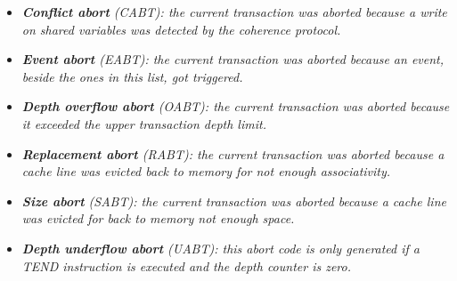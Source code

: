 \documentclass{article}
\begin{document}
            \begin{itemize}

                \item \textit{\textbf{Conflict abort} (CABT): the current transaction was aborted because a write on shared variables was detected by the coherence protocol.}

                \item \textit{\textbf{Event abort} (EABT): the current transaction was aborted because an event, beside the ones in this list, got triggered.}

                \item \textit{\textbf{Depth overflow abort} (OABT): the current transaction was aborted because it exceeded the upper transaction depth limit.}

                \item \textit{\textbf{Replacement abort} (RABT): the current transaction was aborted because a cache line was evicted back to memory for not enough associativity.}

                \item \textit{\textbf{Size abort} (SABT): the current transaction was aborted because a cache line was evicted for back to memory not enough space.}

                \item \textit{\textbf{Depth underflow abort} (UABT): this abort code is only generated if a TEND instruction is executed and the depth counter is zero.}

            \end{itemize}
\end{document}
